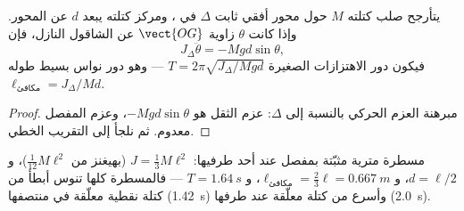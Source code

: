 \begin{proposition}\label{prop:b2:rigid-body-mechanics:pendulum}
يتأرجح صلب كتلته $M$ حول محور أفقي ثابت $\Delta$ في ، ومركز كتلته يبعد $d$ عن المحور. وإذا كانت $\theta$ زاوية
$\vect{OG}$ عن الشاقول النازل، فإن
\[
J_\Delta\ddot\theta = -Mgd\sin\theta ,
\]
فيكون دور الاهتزازات الصغيرة $T = 2\pi\sqrt{J_\Delta/Mgd}$ --- وهو
دور نواس بسيط طوله $\ell_{\text{مكافئ}} = J_\Delta/Md$.
\end{proposition}

\begin{proof}
مبرهنة العزم الحركي بالنسبة إلى $\Delta$: عزم الثقل هو
$-Mgd\sin\theta$، وعزم المفصل معدوم. ثم نلجأ إلى التقريب الخطي.
\end{proof}

\begin{example}\label{ex:b2:rigid-body-mechanics:rule}
مسطرة مترية مثبّتة بمفصل عند أحد طرفيها: $J = \tfrac13M\ell^2$ (بهيغنز من
$\tfrac1{12}M\ell^2$)، و $d = \ell/2$، و $\ell_{\text{مكافئ}} = \tfrac23\ell =
\qty{0.667}{m}$، و $T = \qty{1.64}{s}$ --- فالمسطرة كلها تنوس أبطأ من
كتلة نقطية معلّقة في منتصفها (\qty{1.42}{s}) وأسرع من كتلة معلّقة
عند طرفها (\qty{2.0}{s}).
\end{example}

